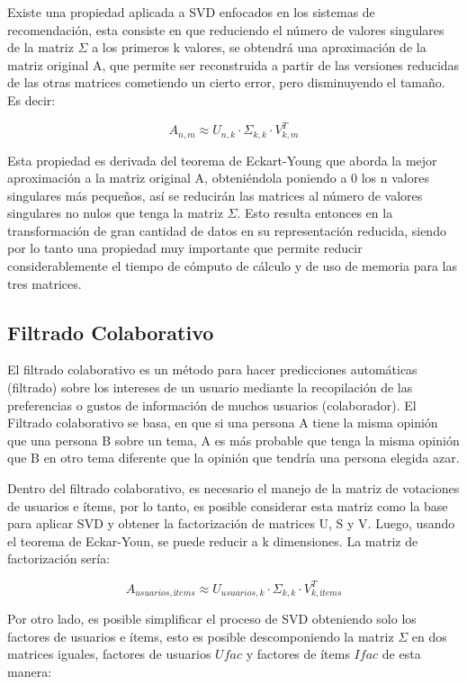 \documentclass{article}
\begin{document}
Existe una propiedad 
aplicada a SVD enfocados en los sistemas 
de recomendación, esta consiste en que 
reduciendo el número de valores singulares 
de la matriz $\Sigma$ a los primeros k valores, se 
obtendrá una aproximación de la matriz 
original A, que permite ser reconstruida a 
partir de las versiones reducidas de las otras 
matrices cometiendo un cierto error, pero 
disminuyendo el tamaño. Es decir: 

$$ 
A_{n, m} \approx U_{n, k} \cdot \Sigma_{k, k} \cdot V^T_{k, m}  
$$

Esta propiedad es derivada del 
teorema de Eckart-Young que aborda 
la mejor aproximación a la matriz original 
A, obteniéndola poniendo a 0 los n valores 
singulares más pequeños, así se reducirán 
las matrices al número de valores singulares 
no nulos que tenga la matriz $\Sigma$. Esto resulta 
entonces en la transformación de gran cantidad 
de datos en su representación reducida, siendo 
por lo tanto una propiedad muy importante 
que permite reducir considerablemente el 
tiempo de cómputo de cálculo y de uso de 
memoria para las tres matrices.

\subsection{Filtrado Colaborativo}

El filtrado colaborativo es un método para hacer predicciones automáticas (filtrado) sobre los intereses de un usuario mediante la recopilación de las preferencias o gustos de información de muchos usuarios (colaborador). El Filtrado colaborativo se basa, en que si una persona A tiene la misma opinión que una persona B sobre un tema, A es más probable que tenga la misma opinión que B en otro tema diferente que la opinión que tendría una persona elegida azar. 

Dentro del filtrado colaborativo, es necesario el 
manejo de la matriz de votaciones de usuarios 
e ítems, por lo tanto, es posible considerar esta 
matriz como la base para aplicar SVD y obtener la 
factorización de matrices U, S y V. Luego, usando 
el teorema de Eckar-Youn, se puede reducir a k
dimensiones. La matriz de factorización sería:

$$ 
A_{usuarios, ítems} \approx U_{usuarios, k} \cdot \Sigma_{k, k} \cdot V^T_{k, ítems}
$$

Por otro lado, es posible simplificar 
el proceso de SVD obteniendo solo los 
factores de usuarios e ítems, esto es posible 
descomponiendo la matriz $\Sigma$ en dos matrices 
iguales, factores de usuarios $Ufac$ y factores de 
ítems $Ifac$ de esta manera:
\end{document}
